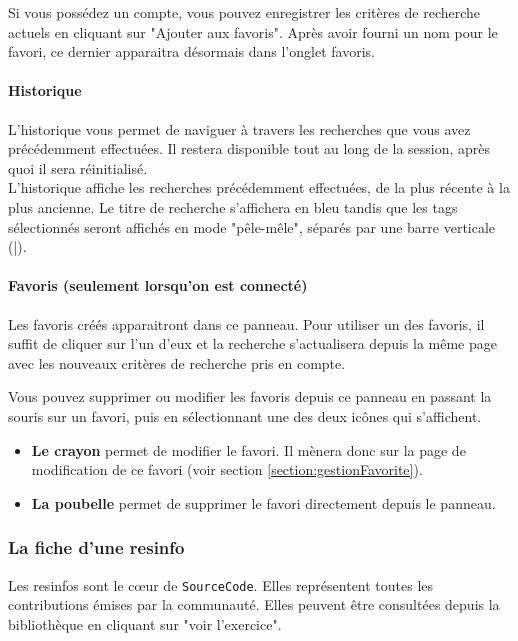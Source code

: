 Si vous possédez un compte, vous pouvez enregistrer les critères de recherche actuels en cliquant sur "Ajouter aux favoris". Après avoir fourni un nom pour le favori, ce dernier apparaitra désormais dans l'onglet favoris.\\

\paragraph{Historique} L'historique vous permet de naviguer à travers les recherches que vous avez précédemment effectuées. Il restera disponible tout au long de la session, après quoi il sera réinitialisé.\\

L'historique affiche les recherches précédemment effectuées, de la plus récente à la plus ancienne. Le titre de recherche s'affichera en bleu tandis que les \glspl{tag} sélectionnés seront affichés en mode "pêle-mêle", séparés par une barre verticale (|).\\

\paragraph{Favoris (seulement lorsqu'on est connecté)} Les favoris créés apparaitront dans ce panneau. Pour utiliser un des favoris, il suffit de cliquer sur l'un d'eux et la recherche s'actualisera depuis la même page avec les nouveaux critères de recherche pris en compte.

Vous pouvez supprimer ou modifier les favoris depuis ce panneau en passant la souris sur un favori, puis en sélectionnant une des deux icônes qui s'affichent.

\begin{itemize}
    \item \textbf{Le crayon} permet de modifier le favori. Il mènera donc sur la page de modification de ce favori (voir section \ref{section:gestionFavorite}).
    \item \textbf{La poubelle} permet de supprimer le favori directement depuis le panneau.
\end{itemize}

\subsubsection{La \gls{fiche} d’une \gls{resinfo}}
\label{section:ficheResInfo}

Les \glspl{resinfo} sont le cœur de \texttt{SourceCode}. Elles représentent toutes les contributions émises par la communauté. Elles peuvent être consultées depuis la bibliothèque en cliquant sur "voir l'exercice".\\


